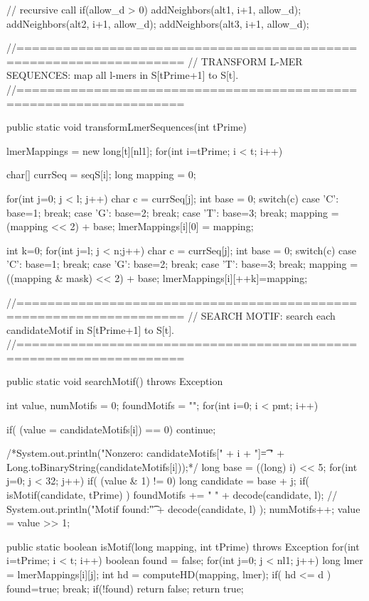 \documentclass[oneside,12pt]{DISCSthesis}
\begin{document}
{\begin{footnotesize}
\begin{verbatimtab}[2]
{{{      // recursive call
      if(allow_d > 0) {
        addNeighbors(alt1, i+1, allow_d);
        addNeighbors(alt2, i+1, allow_d);
        addNeighbors(alt3, i+1, allow_d);
      }

    }
  }

//===================================================================
// TRANSFORM L-MER SEQUENCES: map all l-mers in S[tPrime+1] to S[t].
//===================================================================

  public static void transformLmerSequences(int tPrime) {
    lmerMappings = new long[t][nl1];
    for(int i=tPrime; i < t; i++) {
      char[] currSeq = seqS[i];
      long mapping = 0;

      for(int j=0; j < l; j++) {
        char c = currSeq[j];
        int base = 0;
        switch(c) {
          case 'C': base=1; break;
          case 'G': base=2; break;
          case 'T': base=3; break;
        }
        mapping = (mapping << 2) + base;
      }
      lmerMappings[i][0] = mapping;

      int k=0;
      for(int j=l; j < n;j++) {
        char c = currSeq[j];
        int base = 0;
        switch(c) {
          case 'C': base=1; break;
          case 'G': base=2; break;
          case 'T': base=3; break;
        }
        mapping = ((mapping & mask) << 2) + base;
        lmerMappings[i][++k]=mapping;
      }

    }
  }

//===================================================================
// SEARCH MOTIF: search each candidateMotif in S[tPrime+1] to S[t].
//===================================================================

  public static void searchMotif() throws Exception {
    int value, numMotifs = 0;
    foundMotifs = "";
    for(int i=0; i < pmt; i++) {
      if( (value = candidateMotifs[i]) == 0)
        continue;

      /*System.out.println("Nonzero: candidateMotifs[" + i + "]\t= "
        + Long.toBinaryString(candidateMotifs[i]));*/
      long base = ((long) i) << 5;
      for(int j=0; j < 32; j++) {
        if( (value & 1) != 0) {
          long candidate = base + j;
          if( isMotif(candidate, tPrime) ) {
            foundMotifs += " " + decode(candidate, l);
            // System.out.println("Motif found:\t" + decode(candidate, l) );
            numMotifs++;
          }
        }
        value = value >> 1;
      }
    }
  }

  public static boolean isMotif(long mapping, 
                                int tPrime) throws Exception {
    for(int i=tPrime; i < t; i++) {
      boolean found = false;
      for(int j=0; j < nl1; j++) {
        long lmer = lmerMappings[i][j];
        int hd = computeHD(mapping, lmer);
        if( hd <= d ) {
          found=true;
          break;
        }
      }
      if(!found) {
        return false;
      }
    }
    return true;
  }

}
\end{verbatimtab}
\end{footnotesize}}
\end{document}
